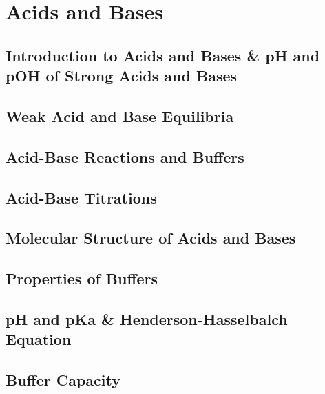 \documentclass[../chem.tex]{subfiles}
\begin{document}
\chapter{Acids and Bases}
\section{Introduction to Acids and Bases \& pH and pOH of Strong Acids and Bases}
\section{Weak Acid and Base Equilibria}
\section{Acid-Base Reactions and Buffers}
\section{Acid-Base Titrations}
\section{Molecular Structure of Acids and Bases}
\section{Properties of Buffers}
\section{pH and pKa \& Henderson-Hasselbalch Equation}
\section{Buffer Capacity}
\end{document}
